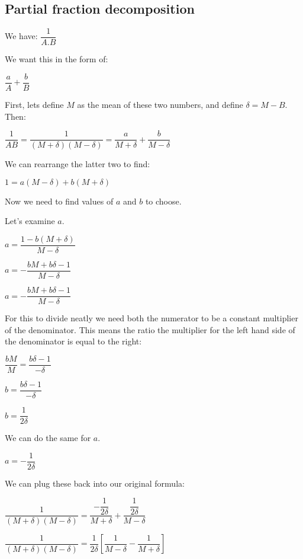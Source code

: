 \subsection{Partial fraction decomposition}

We have:
\(\dfrac{1}{A.B}\)

We want this in the form of:

\(\dfrac{a}{A}+\dfrac{b}{B}\)

First, lets define \(M\) as the mean of these two numbers, and define \(\delta=M-B\). Then:

\(\dfrac{1}{AB}=\dfrac{1}{(M+\delta)(M-\delta)}=\dfrac{a}{M+\delta}+\dfrac{b}{M-\delta}\)

We can rearrange the latter two to find:

\(1=a(M-\delta)+b(M+\delta)\)

Now we need to find values of \(a\) and \(b\) to choose.

Let's examine \(a\).

\(a=\dfrac{1-b(M+\delta)}{M-\delta}\)

\(a=-\dfrac{bM+b\delta -1}{M-\delta}\)

\(a=-\dfrac{bM+b\delta -1}{M-\delta}\)

For this to divide neatly we need both the numerator to be a constant multiplier of the denominator. This means the ratio the multiplier for the left hand side of the denominator is equal to the right:

\(\dfrac{bM}{M}=\dfrac{b\delta -1}{-\delta}\)

\(b=\dfrac{b\delta -1}{-\delta}\)

\(b=\dfrac{1}{2\delta}\)

We can do the same for \(a\).

\(a=-\dfrac{1}{2\delta}\)

We can plug these back into our original formula:

\(\dfrac{1}{(M+\delta)(M-\delta)}=\dfrac{-\dfrac{1}{2\delta}}{M+\delta}+\dfrac{\dfrac{1}{2\delta}}{M-\delta}\)

\(\dfrac{1}{(M+\delta)(M-\delta)}=\dfrac{1}{2\delta}[\dfrac{1}{M-\delta}-\dfrac{1}{M+\delta}]\)

